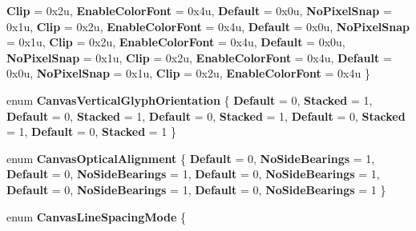 \begin{DoxyCompactItemize}
{\bfseries Clip} = 0x2u, 
{\bfseries Enable\+Color\+Font} = 0x4u, 
\newline
{\bfseries Default} = 0x0u, 
{\bfseries No\+Pixel\+Snap} = 0x1u, 
{\bfseries Clip} = 0x2u, 
{\bfseries Enable\+Color\+Font} = 0x4u, 
\newline
{\bfseries Default} = 0x0u, 
{\bfseries No\+Pixel\+Snap} = 0x1u, 
{\bfseries Clip} = 0x2u, 
{\bfseries Enable\+Color\+Font} = 0x4u, 
\newline
{\bfseries Default} = 0x0u, 
{\bfseries No\+Pixel\+Snap} = 0x1u, 
{\bfseries Clip} = 0x2u, 
{\bfseries Enable\+Color\+Font} = 0x4u, 
\newline
{\bfseries Default} = 0x0u, 
{\bfseries No\+Pixel\+Snap} = 0x1u, 
{\bfseries Clip} = 0x2u, 
{\bfseries Enable\+Color\+Font} = 0x4u
 \}
\item 
\mbox{\label{namespace_microsoft_1_1_graphics_1_1_canvas_1_1_text_ac948f04f716279fad132d07892e44d18}} 
enum {\bfseries Canvas\+Vertical\+Glyph\+Orientation} \{ \newline
{\bfseries Default} = 0, 
{\bfseries Stacked} = 1, 
{\bfseries Default} = 0, 
{\bfseries Stacked} = 1, 
\newline
{\bfseries Default} = 0, 
{\bfseries Stacked} = 1, 
{\bfseries Default} = 0, 
{\bfseries Stacked} = 1, 
\newline
{\bfseries Default} = 0, 
{\bfseries Stacked} = 1
 \}
\item 
\mbox{\label{namespace_microsoft_1_1_graphics_1_1_canvas_1_1_text_aa1f89365afa2b2891e65edc60ec74cdd}} 
enum {\bfseries Canvas\+Optical\+Alignment} \{ \newline
{\bfseries Default} = 0, 
{\bfseries No\+Side\+Bearings} = 1, 
{\bfseries Default} = 0, 
{\bfseries No\+Side\+Bearings} = 1, 
\newline
{\bfseries Default} = 0, 
{\bfseries No\+Side\+Bearings} = 1, 
{\bfseries Default} = 0, 
{\bfseries No\+Side\+Bearings} = 1, 
\newline
{\bfseries Default} = 0, 
{\bfseries No\+Side\+Bearings} = 1
 \}
\item 
\mbox{\label{namespace_microsoft_1_1_graphics_1_1_canvas_1_1_text_a0af1601f34ce8114935e99af136dc8cc}} 
enum {\bfseries Canvas\+Line\+Spacing\+Mode} \{ \newline

\end{DoxyCompactItemize}
